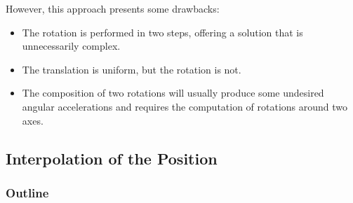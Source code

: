 \documentclass[10pt, aspectratio=169]{beamer}
\theoremstyle{remark}
\theoremstyle{definition}
\begin{document}
\begin{frame}[allowframebreaks]
However, this approach presents some drawbacks:

\begin{itemize}
    \item The rotation is performed in two steps, offering a solution that is unnecessarily complex.
    \item The translation is uniform, but the rotation is not.
    \item The composition of two rotations will usually produce some undesired angular accelerations and requires the computation of rotations around two axes.
\end{itemize}
 
\end{frame}

\subsection{Interpolation of the Position}
\begin{frame}
	\frametitle{Outline} %
\end{frame}
\end{document}
